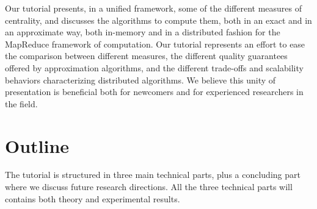 \documentclass[pdfpagelabels=false]{sig-alternate-2013} %
\begin{document}
Our tutorial presents, in a unified framework, some of the different measures of
centrality, and discusses the algorithms to compute them, both in an exact and in
an approximate way, both in-memory and in a distributed fashion for the
MapReduce framework of computation. Our tutorial represents an effort to ease the
comparison between different measures, the different quality guarantees offered
by approximation algorithms, and the different trade-offs and scalability
behaviors characterizing distributed algorithms. We believe this unity
of presentation is beneficial both for newcomers and for experienced researchers
in the field.

\section{Outline}
The tutorial is structured in three main technical parts, plus a concluding part
where we discuss future research directions. All the three technical parts will
contains both theory and experimental results.
\end{document}
